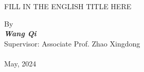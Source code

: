 {   
    \heiti                                                                  %
    \setlength\parindent{0em}                                               %
\vspace*{0.5cm}
\begin{center}  
\begin{spacing}{2.0}
 {\textrm{\MakeUppercase{
Fill in the English title here}}}  
 \end{spacing}
\end{center}

\vspace*{11.1cm}
\begin{center}  
\begin{spacing}{2}
 {\textrm{By }\\ \textbf{\textit{Wang Qi}}  \\ Supervisor: Associate Prof. Zhao Xingdong \\ \:\:\:\:\:\:\:\:\:\:\:\:\:\:\:\:\:   \\
  May,  2024} 
 \end{spacing}
\end{center} }
